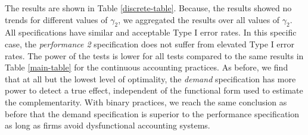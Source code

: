 \documentclass[12pt]{article}
\begin{document}
The results are shown in Table \ref{discrete-table}. Because, the results showed no trends for different values of $\gamma_2$, we aggregated the results over all values of $\gamma_2$. All specifications have similar and acceptable Type I error rates. In this specific case, the \emph{performance 2} specification does not suffer from elevated Type I error rates. The power of the tests is lower for all tests compared to the same results in Table \ref{main-table} for the continuous accounting practices. As before, we find that at all but the lowest level of optimality, the \emph{demand} specification has more power to detect a true effect, independent of the functional form used to estimate the complementarity. With binary practices, we reach the same conclusion as before that the demand specification is superior to the performance specification as long as firms avoid dysfunctional accounting systems. 


\end{document}
